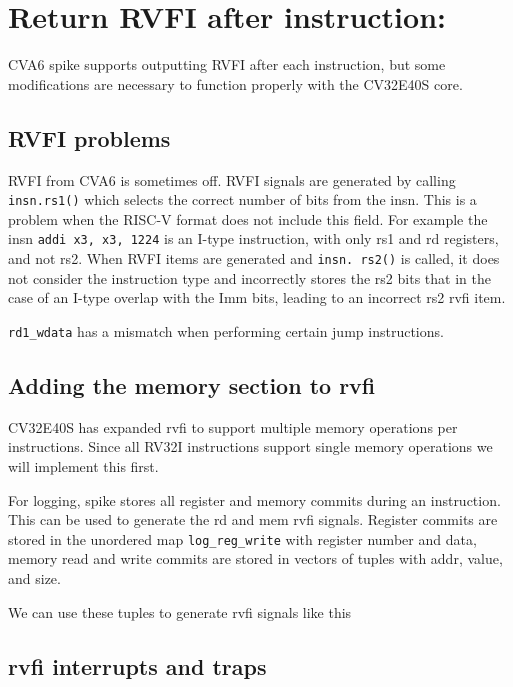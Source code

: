 \section{Return RVFI after instruction: }

CVA6 spike supports outputting RVFI after each instruction, but some modifications are necessary to function properly with the CV32E40S core.

\subsection{RVFI problems}
RVFI from CVA6 is sometimes off. RVFI signals are generated by calling \lstinline{insn.rs1()} which selects the correct number of bits from the insn. This is a problem when the RISC-V format does not include this field. For example the insn \lstinline{addi x3, x3, 1224} is an I-type instruction, with only rs1 and rd registers, and not rs2. When RVFI items are generated and \lstinline{insn. rs2()} is called, it does not consider the instruction type and incorrectly stores the rs2 bits that in the case of an I-type overlap with the Imm bits, leading to an incorrect rs2 rvfi item.

\lstinline{rd1_wdata} has a mismatch when performing certain jump instructions.


\subsection{Adding the memory section to rvfi}

CV32E40S has expanded rvfi to support multiple memory operations per instructions\cite{openhwgroupRISCVFormalInterface2023}. Since all RV32I instructions support single memory operations we will implement this first.

For logging, spike stores all register and memory commits during an instruction. This can be used to generate the rd and mem rvfi signals. Register commits are stored in the unordered map \lstinline{log_reg_write} with register number and data, memory read and write commits are stored in vectors of tuples with addr, value, and size.

We can use these tuples to generate rvfi signals like this 

\subsection{rvfi interrupts and traps}

